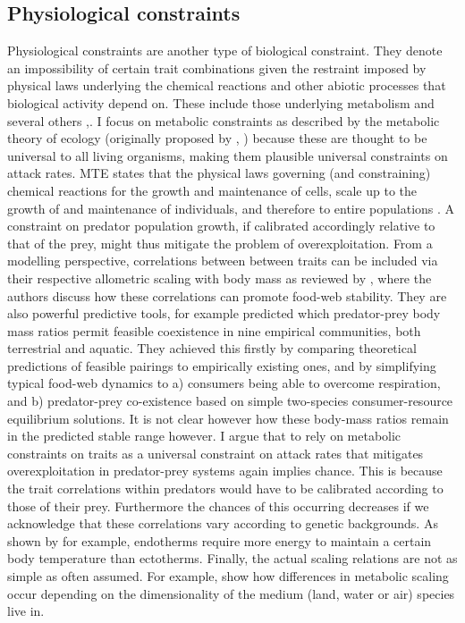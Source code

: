 \documentclass[a4paper]{report}
\begin{document}
\subsection{Physiological constraints \label{sec:physiological_constraints}} Physiological constraints are another type of biological constraint. They denote an impossibility of certain trait combinations given the restraint imposed by physical laws underlying the chemical reactions and other abiotic processes that biological activity depend on. These include those underlying metabolism and several others \citep{Pauly2017},\citep{Brett2000}. I focus on metabolic constraints as described by the metabolic theory of ecology (originally proposed by \citep{brown}, \citep{Savage2004}) because these are thought to be universal to all living organisms, making them plausible universal constraints on attack rates. MTE states that the physical laws governing (and constraining) chemical reactions for the growth and maintenance of cells, scale up to the growth of and maintenance of individuals, and therefore to entire populations \citep{brown}. A constraint on predator population growth, if calibrated accordingly relative to that of the prey, might thus mitigate the problem of overexploitation. From a modelling perspective, correlations between between traits can be included via their respective allometric scaling with body mass as reviewed by \citep{Pierre2019}, where the authors discuss how these correlations can promote food-web stability. They are also powerful predictive tools, \citep{Pawar2019} for example predicted which predator-prey body mass ratios permit feasible coexistence in nine empirical communities, both terrestrial and aquatic. They achieved this firstly by comparing theoretical predictions of feasible pairings to empirically existing ones, and by simplifying typical food-web dynamics to a) consumers being able to overcome respiration, and b) predator-prey co-existence based on simple two-species consumer-resource equilibrium solutions. It is not clear however how these body-mass ratios remain in the predicted stable range however. I argue that to rely on metabolic constraints on traits as a universal constraint on attack rates that mitigates overexploitation in predator-prey systems again implies chance. This is because the trait correlations within predators would have to be calibrated according to those of their prey. Furthermore the chances of this occurring decreases if we acknowledge that these correlations vary according to genetic backgrounds. As shown by \citep{Werner2018} for example, endotherms require more energy to maintain a certain body temperature than ectotherms. Finally, the actual scaling relations are not as simple as often assumed. For example, \citep{Pawar2012c} show how differences in metabolic scaling occur depending on the dimensionality of the medium (land, water or air) species live in. \\
\end{document}
